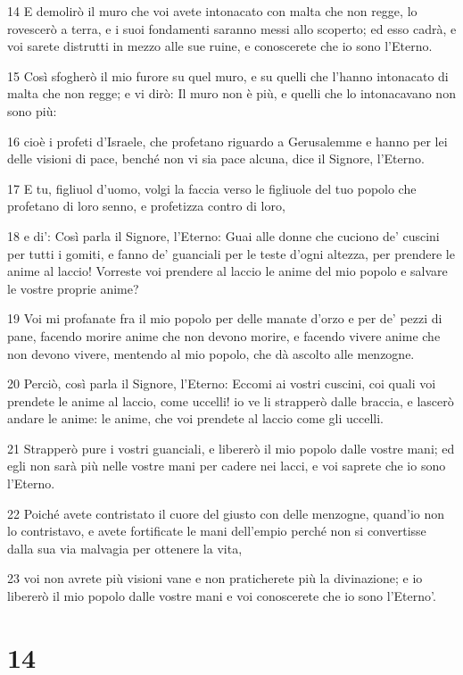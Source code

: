 \par 14 E demolirò il muro che voi avete intonacato con malta che non regge, lo rovescerò a terra, e i suoi fondamenti saranno messi allo scoperto; ed esso cadrà, e voi sarete distrutti in mezzo alle sue ruine, e conoscerete che io sono l'Eterno.
\par 15 Così sfogherò il mio furore su quel muro, e su quelli che l'hanno intonacato di malta che non regge; e vi dirò: Il muro non è più, e quelli che lo intonacavano non sono più:
\par 16 cioè i profeti d'Israele, che profetano riguardo a Gerusalemme e hanno per lei delle visioni di pace, benché non vi sia pace alcuna, dice il Signore, l'Eterno.
\par 17 E tu, figliuol d'uomo, volgi la faccia verso le figliuole del tuo popolo che profetano di loro senno, e profetizza contro di loro,
\par 18 e di': Così parla il Signore, l'Eterno: Guai alle donne che cuciono de' cuscini per tutti i gomiti, e fanno de' guanciali per le teste d'ogni altezza, per prendere le anime al laccio! Vorreste voi prendere al laccio le anime del mio popolo e salvare le vostre proprie anime?
\par 19 Voi mi profanate fra il mio popolo per delle manate d'orzo e per de' pezzi di pane, facendo morire anime che non devono morire, e facendo vivere anime che non devono vivere, mentendo al mio popolo, che dà ascolto alle menzogne.
\par 20 Perciò, così parla il Signore, l'Eterno: Eccomi ai vostri cuscini, coi quali voi prendete le anime al laccio, come uccelli! io ve li strapperò dalle braccia, e lascerò andare le anime: le anime, che voi prendete al laccio come gli uccelli.
\par 21 Strapperò pure i vostri guanciali, e libererò il mio popolo dalle vostre mani; ed egli non sarà più nelle vostre mani per cadere nei lacci, e voi saprete che io sono l'Eterno.
\par 22 Poiché avete contristato il cuore del giusto con delle menzogne, quand'io non lo contristavo, e avete fortificate le mani dell'empio perché non si convertisse dalla sua via malvagia per ottenere la vita,
\par 23 voi non avrete più visioni vane e non praticherete più la divinazione; e io libererò il mio popolo dalle vostre mani e voi conoscerete che io sono l'Eterno'.

\chapter{14}

